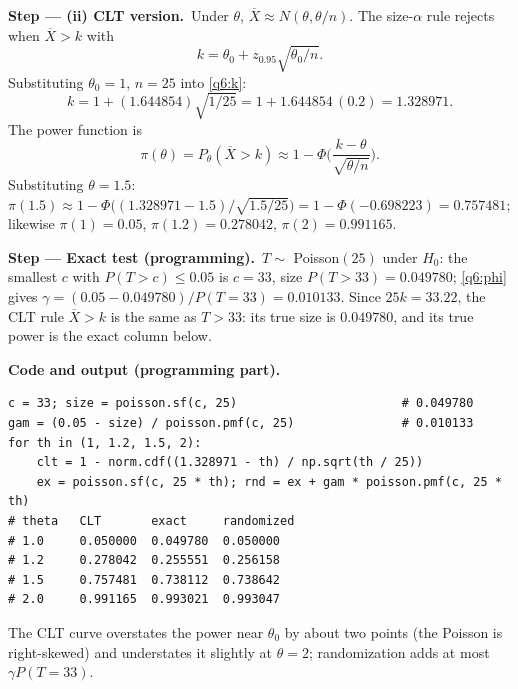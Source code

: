 \documentclass[11pt,a4paper]{article}
\numberwithin{equation}{questao}   %
\newcommand{\passo}[2]{\par\smallskip\noindent\textbf{Step --- #1.}~#2}
\newcommand{\codehead}{\par\smallskip\noindent\textbf{Code and output (programming part).}\par}
\newcommand{\1}{\mathbf{1}}
\begin{document}
\begin{sol}
\passo{(ii) CLT version}{Under $\theta$, $\overline X\approx N(\theta,\theta/n)$. The size-$\alpha$
rule rejects when $\overline X>k$ with}
\begin{equation}\label{q6:k}
k=\theta_0+z_{0.95}\sqrt{\theta_0/n}.
\end{equation}
Substituting $\theta_0=1$, $n=25$ into \eqref{q6:k}:
\[
k=1+(1.644854)\sqrt{1/25}=1+1.644854\,(0.2)=1.328971 .
\]
The power function is
\begin{equation}\label{q6:pow}
\pi(\theta)=P_\theta(\overline X>k)\approx1-\Phi\Big(\frac{k-\theta}{\sqrt{\theta/n}}\Big).
\end{equation}
Substituting $\theta=1.5$: $\pi(1.5)\approx1-\Phi\big((1.328971-1.5)/\sqrt{1.5/25}\big)=1-\Phi(-0.698223)=0.757481$;
likewise $\pi(1)=0.05$, $\pi(1.2)=0.278042$, $\pi(2)=0.991165$.
\begin{center}
\end{center}

\passo{Exact test (programming)}{$T\sim$ Poisson$(25)$ under $H_0$: the smallest $c$ with
$P(T>c)\le0.05$ is $c=33$, size $P(T>33)=0.049780$; \eqref{q6:phi} gives
$\gamma=(0.05-0.049780)/P(T=33)=0.010133$. Since $25k=33.22$, the CLT rule $\overline X>k$ is the
same as $T>33$: its true size is $0.049780$, and its true power is the exact column below.}

\codehead
{\small
\begin{verbatim}
c = 33; size = poisson.sf(c, 25)                       # 0.049780
gam = (0.05 - size) / poisson.pmf(c, 25)               # 0.010133
for th in (1, 1.2, 1.5, 2):
    clt = 1 - norm.cdf((1.328971 - th) / np.sqrt(th / 25))
    ex = poisson.sf(c, 25 * th); rnd = ex + gam * poisson.pmf(c, 25 * th)
# theta   CLT       exact     randomized
# 1.0     0.050000  0.049780  0.050000
# 1.2     0.278042  0.255551  0.256158
# 1.5     0.757481  0.738112  0.738642
# 2.0     0.991165  0.993021  0.993047
\end{verbatim}
}
The CLT curve overstates the power near $\theta_0$ by about two points (the Poisson is right-skewed)
and understates it slightly at $\theta=2$; randomization adds at most $\gamma P(T=33)$.


\end{sol}
\end{document}
